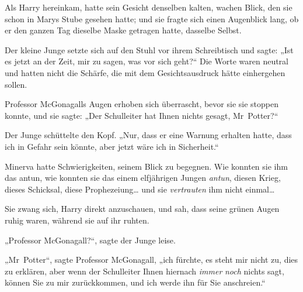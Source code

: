 Als Harry hereinkam, hatte sein Gesicht denselben kalten, wachen Blick, den sie schon in Marys Stube gesehen hatte; und sie fragte sich einen Augenblick lang, ob er den ganzen Tag dieselbe Maske getragen hatte, dasselbe Selbst.

Der kleine Junge setzte sich auf den Stuhl vor ihrem Schreibtisch und sagte: „Ist es jetzt an der Zeit, mir zu sagen, was vor sich geht?“ Die Worte waren neutral und hatten nicht die Schärfe, die mit dem Gesichtsausdruck hätte einhergehen sollen.

Professor McGonagalls Augen erhoben sich überrascht, bevor sie sie stoppen konnte, und sie sagte: „Der Schulleiter hat Ihnen nichts gesagt, Mr~Potter?“

Der Junge schüttelte den Kopf. „Nur, dass er eine Warnung erhalten hatte, dass ich in Gefahr sein könnte, aber jetzt wäre ich in Sicherheit.“

Minerva hatte Schwierigkeiten, seinem Blick zu begegnen. Wie konnten sie ihm das antun, wie konnten sie das einem elfjährigen Jungen \emph{antun}, diesen Krieg, dieses Schicksal, diese Prophezeiung… und sie \emph{vertrauten} ihm nicht einmal…

Sie zwang sich, Harry direkt anzuschauen, und sah, dass seine grünen Augen ruhig waren, während sie auf ihr ruhten.

„Professor McGonagall?“, sagte der Junge leise.

„Mr~Potter“, sagte Professor McGonagall, „ich fürchte, es steht mir nicht zu, dies zu erklären, aber wenn der Schulleiter Ihnen hiernach \emph{immer} \emph{noch} nichts sagt, können Sie zu mir zurückkommen, und ich werde ihn für Sie anschreien.“

